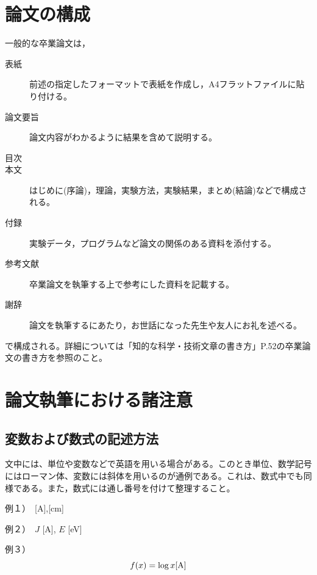\documentclass{jreport}		%
\begin{document}
\section{論文の構成}
一般的な卒業論文は，
\begin{description}
\item[表紙] 前述の指定したフォーマットで表紙を作成し，A4フラットファイルに貼り付ける。
\item[論文要旨] 論文内容がわかるように結果を含めて説明する。
\item[目次]
\item[本文] はじめに(序論)，理論，実験方法，実験結果，まとめ(結論)などで構成される。
\item[付録] 実験データ，プログラムなど論文の関係のある資料を添付する。
\item[参考文献] 卒業論文を執筆する上で参考にした資料を記載する。
\item[謝辞] 論文を執筆するにあたり，お世話になった先生や友人にお礼を述べる。
\end{description}
で構成される。詳細については「知的な科学・技術文章の書き方」P.52の卒業論文の書き方を参照のこと。


\section{論文執筆における諸注意}
\subsection{変数および数式の記述方法}
文中には、単位や変数などで英語を用いる場合がある。このとき単位、数学記号にはローマン体、変数には斜体を用いるのが通例である。これは、数式中でも同様である。また，数式には通し番号を付けて整理すること。\par
例１）　[A],[cm] \par
例２）　$J$ [A], $E$ [eV] \par
例３）
\begin{equation}
f(x) = \log x {\rm [A]}
\end{equation}
\end{document}
